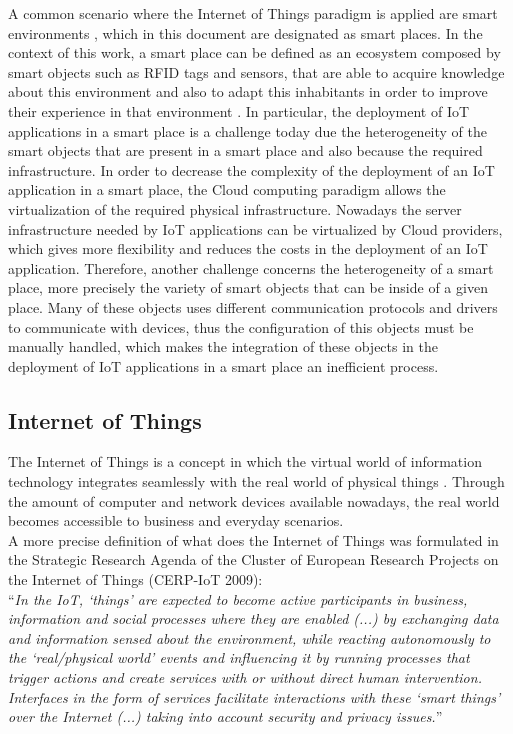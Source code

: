 A common scenario where the Internet of Things paradigm is applied are smart environments \cite{atzori2010internet}, which in this document are designated as smart places.
In the context of this work, a smart place can be defined as an ecosystem composed by smart objects such as RFID tags and sensors, that are able to acquire knowledge about this environment and also to
adapt this inhabitants in order to improve their experience in that environment \cite{cook2004smart}.
In particular, the deployment of IoT applications in a smart place is a challenge today due the heterogeneity of the smart objects that are present in a smart place
and also because the required infrastructure. In order to decrease the complexity of the deployment of an IoT application in a smart place, the Cloud computing paradigm allows the
virtualization of the required physical infrastructure. Nowadays the server infrastructure needed by IoT applications can be virtualized by Cloud providers, which gives more flexibility and reduces
the costs in the deployment of an IoT application.
Therefore, another challenge concerns the heterogeneity of a smart place, more precisely the variety of smart objects that can be inside of a given place. Many of these objects uses different communication
protocols and drivers to communicate with devices, thus the configuration of this objects must be manually handled, which makes the integration of these objects in the deployment of IoT applications in a smart place
an inefficient process.\\
\subsection{Internet of Things}
\label{sub:internet_of_things}
The Internet of Things is a concept in which the virtual world of information technology integrates seamlessly
with the real world of physical things \cite{Uckelmann:2011:AIT:2018904}. Through the amount of computer and network devices
available nowadays, the real world becomes accessible to business and everyday scenarios.\\

A more precise definition of what does the Internet of Things was formulated in the Strategic Research Agenda of the Cluster of European Research Projects
on the Internet of Things (CERP-IoT 2009):\\

``\textit{In the IoT, `things' are expected to become active participants in business, information and social
processes where they are enabled (...) by exchanging data and information  sensed about the environment, while reacting autonomously to the `real/physical world'
events and influencing it by running processes that trigger actions and create services with or without direct human intervention. Interfaces in the form of services
facilitate interactions with these `smart things' over the Internet (...) taking into account security and privacy issues.}''\\


